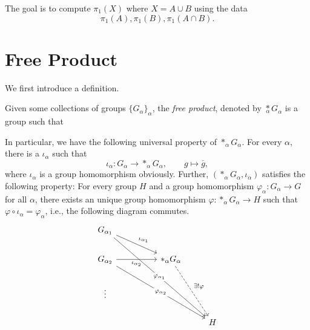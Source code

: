 The goal is to compute \(\pi _1(X)\) where \(X = A\cup B\) using the data
\[
	\pi _1(A), \pi _1(B), \pi _1(A\cap B).
\]

\section{Free Product}
We first introduce a definition.
\begin{definition}\label{def:free-product}
	Given some collections of groups \(\{G_{\alpha }\}_{\alpha }\), the \emph{free product},
	denoted by \(\underset{\alpha}{\ast}G_{\alpha }\) is a group such that
\end{definition}
\begin{remark}
	In particular, we have the following universal property of \(\ast_\alpha G_\alpha \). For every \(\alpha \), there is a \(\iota _\alpha \) such that
	\[
		\iota _\alpha \colon G_\alpha \to \ast_\alpha G_\alpha ,\qquad g\mapsto \overline{g},
	\]
	where \(\iota _\alpha \) is a group homomorphism obviously. Further, \((\ast_\alpha G_\alpha ,\iota _\alpha )\) satisfies the following property: For every
	group \(H\) and a group homomorphism \(\varphi _\alpha \colon G_\alpha \to G\) for all \(\alpha \), there exists an unique group homomorphism \(\varphi \colon \ast_\alpha G_\alpha \to H\)
	such that \(\varphi \circ \iota _\alpha = \varphi _\alpha \), i.e., the following diagram commutes.
	\[
		\begin{tikzcd}
			{G_{\alpha_1}} \\
			{G_{\alpha_2}} && {\ast_\alpha G_\alpha} \\
			\vdots \\
			&&& H
			\arrow["{\iota_{\alpha_1}}", from=1-1, to=2-3]
			\arrow["{\iota_{\alpha_2}}"', from=2-1, to=2-3]
			\arrow["{\exists ! \varphi}", dashed, from=2-3, to=4-4]
			\arrow["{\varphi_{\alpha_1}}"{description}, from=1-1, to=4-4]
			\arrow["{\varphi_{\alpha_2}}"{description}, from=2-1, to=4-4]
		\end{tikzcd}
	\]
\end{remark}
